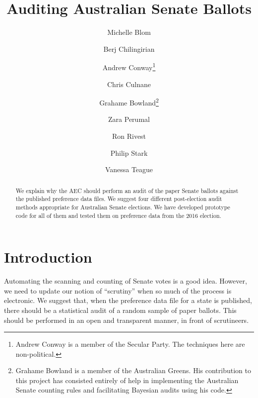 \documentclass[10pt,a4paper]{article}
\begin{document}


\title{Auditing Australian Senate Ballots}
\author[1]{Michelle Blom}
\author[2]{Berj Chilingirian}
\author[ ]{Andrew Conway\thanks{Andrew Conway is a member of the Secular Party.   The techniques here are non-political.}}
\author[1]{Chris Culnane}
\author[ ]{Grahame Bowland\thanks{Grahame Bowland is a member of the Australian Greens.  His contribution to this project has consisted entirely of help in implementing the Australian Senate counting rules and facilitating Bayesian audits using his code. }}
\author[2]{Zara Perumal}
\author[2]{Ron Rivest}
\author[3]{Philip Stark}
\author[1]{Vanessa Teague}
\maketitle

\tableofcontents

\begin{abstract}
We explain why the AEC should perform an audit of the paper Senate  ballots against the published preference data files.  We suggest four different post-election audit methods appropriate for Australian Senate elections.  We have developed prototype code for all of them and tested them on preference data from the 2016 election.  
\end{abstract}

\section{Introduction} Automating the scanning and counting of Senate votes is a good idea. However, we need to update our notion of  ``scrutiny'' when so much of the process is electronic.  We suggest that, when the preference data file for a state is published, there should be a statistical audit of a random sample of paper ballots.
This should be performed in an open and transparent manner, in front of scrutineers. 
\end{document}
